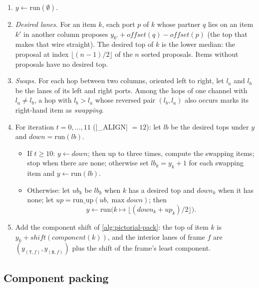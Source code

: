 \begin{algorithm}\label{alg:pictorial-align}
\begin{enumerate}
  \item $y\gets\mathrm{run}(\emptyset)$.
  \item \emph{Desired lanes.} For an item $k$, each port $p$ of $k$ whose partner $q$ lies on an
    item $k'$ in another column proposes $y_{k'} + \mathit{offset}(q) - \mathit{offset}(p)$ (the
    top that makes that wire straight). The desired top of $k$ is the lower median: the
    proposal at index $\lfloor(n-1)/2\rfloor$ of the $n$ sorted proposals. Items without
    proposals have no desired top.
  \item \emph{Swaps.} For each hop between two columns, oriented left to right, let $l_a$ and
    $l_b$ be the lanes of its left and right ports. Among the hops of one channel with
    $l_a\neq l_b$, a hop with $l_b>l_a$ whose reversed pair $(l_b, l_a)$ also occurs marks its
    right-hand item as \emph{swapping}.
  \item For iteration $t = 0, \dots, 11$ (\py|_ALIGN| $=12$): let $\mathit{lb}$ be the desired
    tops under $y$ and $\mathit{down} = \mathrm{run}(\mathit{lb})$.
    \begin{itemize}
      \item If $t\ge 10$: $y\gets\mathit{down}$; then up to three times, compute the swapping
        items; stop when there are none; otherwise set $\mathit{lb}_k = y_k + 1$ for each
        swapping item and $y\gets\mathrm{run}(\mathit{lb})$.
      \item Otherwise: let $\mathit{ub}_k$ be $\mathit{lb}_k$ when $k$ has a desired top and
        $\mathit{down}_k$ when it has none; let
        $\mathit{up} = \mathrm{run\_up}(\mathit{ub}, \max\mathit{down})$; then
        \[ y \gets \mathrm{run}\bigl(k\mapsto\lfloor(\mathit{down}_k+\mathit{up}_k)/2\rfloor\bigr). \]
    \end{itemize}
  \item Add the component shift of \cref{alg:pictorial-pack}: the top of item $k$ is
    $y_k + \mathit{shift}(\mathit{component}(k))$, and the interior lanes of frame $f$ are
    $(y_{(\mathtt{T},f)}, y_{(\mathtt{B},f)})$ plus the shift of the frame's least component.
\end{enumerate}
\end{algorithm}

\subsection{Component packing}\label{sec:pictorial-pack}

